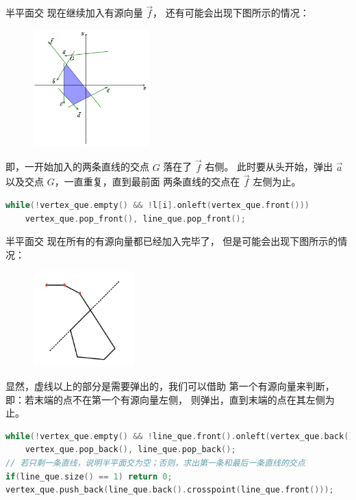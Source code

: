 \documentclass{beamer}
\begin{document}
\begin{frame}[fragile]{半平面交}
    \footnotesize
    现在继续加入有源向量 $\overrightarrow{f}$，
    还有可能会出现下图所示的情况：

    \begin{figure}[H]
        \centering
        \includegraphics[width=0.4\textwidth]{pic/halfplane_2.png}
    \end{figure}

    即，一开始加入的两条直线的交点 $G$ 落在了 $\overrightarrow{f}$ 右侧。
    此时要从头开始，弹出 $\overrightarrow{a}$ 以及交点 $G$，一直重复，直到最前面
    两条直线的交点在 $\overrightarrow{f}$ 左侧为止。
    
    \pause
    \begin{lstlisting}[language=c++]
while(!vertex_que.empty() && !l[i].onleft(vertex_que.front()))
    vertex_que.pop_front(), line_que.pop_front();
    \end{lstlisting}
\end{frame}

\begin{frame}[fragile]{半平面交}
    \footnotesize
    现在所有的有源向量都已经加入完毕了，
    但是可能会出现下图所示的情况：

    \begin{figure}[H]
        \centering
        \includegraphics[width=0.35\textwidth]{pic/halfplane_3.jpg}
    \end{figure}

    显然，虚线以上的部分是需要弹出的，我们可以借助
    第一个有源向量来判断，即：若末端的点不在第一个有源向量左侧，
    则弹出，直到末端的点在其左侧为止。

    \pause
    \begin{lstlisting}[language=c++]
while(!vertex_que.empty() && !line_que.front().onleft(vertex_que.back()))
    vertex_que.pop_back(), line_que.pop_back();
// 若只剩一条直线，说明半平面交为空；否则，求出第一条和最后一条直线的交点
if(line_que.size() == 1) return 0;
vertex_que.push_back(line_que.back().crosspoint(line_que.front()));
    \end{lstlisting}
\end{frame}
\end{document}
